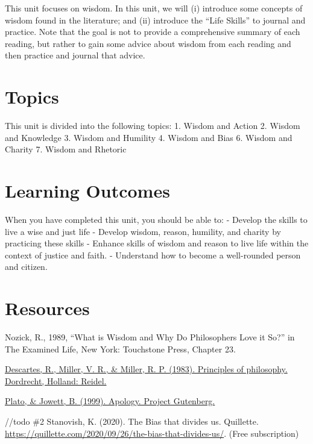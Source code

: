 \documentclass[
]{book}
\begin{document}
This unit focuses on wisdom. In this unit, we will (i) introduce some concepts of wisdom found in the literature; and (ii) introduce the ``Life Skills'' to journal and practice. Note that the goal is not to provide a comprehensive summary of each reading, but rather to gain some advice about wisdom from each reading and then practice and journal that advice.

\hypertarget{topics}{%
\section{Topics}\label{topics}}

This unit is divided into the following topics:
1. Wisdom and Action
2. Wisdom and Knowledge
3. Wisdom and Humility
4. Wisdom and Bias
6. Wisdom and Charity
7. Wisdom and Rhetoric

\hypertarget{learning-outcomes}{%
\section{Learning Outcomes}\label{learning-outcomes}}

When you have completed this unit, you should be able to:
- Develop the skills to live a wise and just life
- Develop wisdom, reason, humility, and charity by practicing these skills
- Enhance skills of wisdom and reason to live life within the context of justice and faith.
- Understand how to become a well-rounded person and citizen.

\hypertarget{resources}{%
\section{Resources}\label{resources}}

Nozick, R., 1989, ``What is Wisdom and Why Do Philosophers Love it So?'' in The Examined Life, New York: Touchstone Press, Chapter 23.

\href{https://www.earlymoderntexts.com/assets/pdfs/descartes1644part1.pdf}{Descartes, R., Miller, V. R., \& Miller, R. P. (1983). Principles of philosophy. Dordrecht, Holland: Reidel.}

\href{https://twu.idm.oclc.org/login?url=https://search.ebscohost.com/login.aspx?direct=true\&db=nlebk\&AN=1085368\&site=eds-live\&scope=site\&ebv=EB\&ppid=pp_1}{Plato, \& Jowett, B. (1999). Apology. Project Gutenberg.}

//todo \#2
Stanovish, K. (2020). The Bias that divides us. Quillette. \url{https://quillette.com/2020/09/26/the-bias-that-divides-us/}. (Free subscription)
\end{document}
